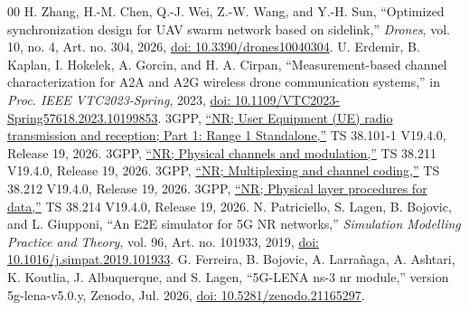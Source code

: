 \begin{thebibliography}{00}
 H. Zhang, H.-M. Chen, Q.-J. Wei, Z.-W. Wang, and Y.-H. Sun, ``Optimized synchronization design for UAV swarm network based on sidelink,'' \emph{Drones}, vol. 10, no. 4, Art. no. 304, 2026, \href{https://doi.org/10.3390/drones10040304}{doi: 10.3390/drones10040304}.
 U. Erdemir, B. Kaplan, I. Hokelek, A. Gorcin, and H. A. Cirpan, ``Measurement-based channel characterization for A2A and A2G wireless drone communication systems,'' in \emph{Proc. IEEE VTC2023-Spring}, 2023, \href{https://doi.org/10.1109/VTC2023-Spring57618.2023.10199853}{doi: 10.1109/VTC2023-Spring57618.2023.10199853}.
 3GPP, \href{https://www.3gpp.org/dynareport/38101-1.htm}{``NR; User Equipment (UE) radio transmission and reception; Part 1: Range 1 Standalone,''} TS 38.101-1 V19.4.0, Release 19, 2026.
 3GPP, \href{https://www.3gpp.org/dynareport/38211.htm}{``NR; Physical channels and modulation,''} TS 38.211 V19.4.0, Release 19, 2026.
 3GPP, \href{https://www.3gpp.org/dynareport/38212.htm}{``NR; Multiplexing and channel coding,''} TS 38.212 V19.4.0, Release 19, 2026.
 3GPP, \href{https://www.3gpp.org/dynareport/38214.htm}{``NR; Physical layer procedures for data,''} TS 38.214 V19.4.0, Release 19, 2026.
 N. Patriciello, S. Lagen, B. Bojovic, and L. Giupponi, ``An E2E simulator for 5G NR networks,'' \emph{Simulation Modelling Practice and Theory}, vol. 96, Art. no. 101933, 2019, \href{https://doi.org/10.1016/j.simpat.2019.101933}{doi: 10.1016/j.simpat.2019.101933}.
 G. Ferreira, B. Bojovic, A. Larra\~naga, A. Ashtari, K. Koutlia, J. Albuquerque, and S. Lagen, ``5G-LENA ns-3 nr module,'' version 5g-lena-v5.0.y, Zenodo, Jul. 2026, \href{https://doi.org/10.5281/zenodo.21165297}{doi: 10.5281/zenodo.21165297}.
\end{thebibliography}
